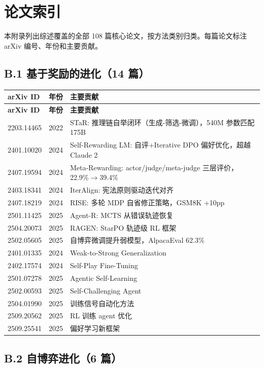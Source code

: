 \section{论文索引}\label{app:papers}

本附录列出综述覆盖的全部 108 篇核心论文，按方法类别归类。每篇论文标注 arXiv 编号、年份和主要贡献。

\subsection*{B.1 基于奖励的进化（14 篇）}

\begin{longtable}{llp{7cm}}
\toprule
\textbf{arXiv ID} & \textbf{年份} & \textbf{主要贡献} \\
\midrule
\endfirsthead
\toprule
\textbf{arXiv ID} & \textbf{年份} & \textbf{主要贡献} \\
\midrule
\endhead
\bottomrule
\endlastfoot

2203.14465 & 2022 & STaR: 推理链自举闭环（生成-筛选-微调），540M 参数匹配 175B \\
2401.10020 & 2024 & Self-Rewarding LM: 自评+Iterative DPO 偏好优化，超越 Claude 2 \\
2407.19594 & 2024 & Meta-Rewarding: actor/judge/meta-judge 三层评价，22.9\%$\to$39.4\% \\
2403.18341 & 2024 & IterAlign: 宪法原则驱动迭代对齐 \\
2407.18219 & 2024 & RISE: 多轮 MDP 自省修正策略，GSM8K +10pp \\
2501.11425 & 2025 & Agent-R: MCTS 从错误轨迹恢复 \\
2504.20073 & 2025 & RAGEN: StarPO 轨迹级 RL 框架 \\
2502.05605 & 2025 & 自博弈微调提升弱模型，AlpacaEval 62.3\% \\
2401.01335 & 2024 & Weak-to-Strong Generalization \\
2402.17574 & 2024 & Self-Play Fine-Tuning \\
2501.07278 & 2025 & Agentic Self-Learning \\
2502.00593 & 2025 & Self-Challenging Agent \\
2504.01990 & 2025 & 训练信号自动化方法 \\
2509.20562 & 2025 & RL 训练 agent 优化 \\
2509.25541 & 2025 & 偏好学习新框架 \\
\end{longtable}

\subsection*{B.2 自博弈进化（6 篇）}

